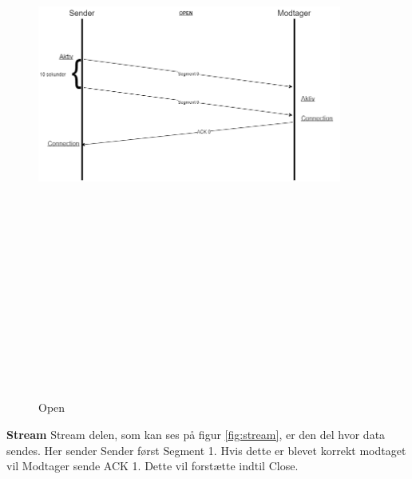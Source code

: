 \begin{figure}[ht]
	\centering
	\includegraphics[width=10cm,height=20cm,keepaspectratio]{pictures/Open.png}
	\caption{Open}
	\label{fig:open}
\end{figure}

\hfill \break
\textbf{Stream}
\newline
Stream delen, som kan ses på figur \ref{fig:stream}, er den del hvor data sendes.
\newline
Her sender Sender først Segment 1. Hvis dette er blevet korrekt modtaget vil Modtager sende ACK 1.
Dette vil forstætte indtil Close. 

